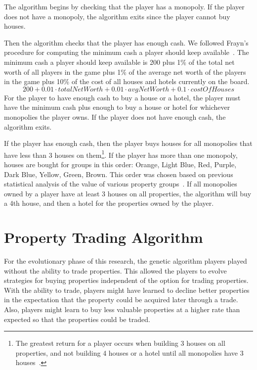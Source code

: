 The algorithm begins by checking that the player has a monopoly. If the player
does not have a monopoly, the algorithm exits since the player cannot buy
houses.

Then the algorithm checks that the player has enough cash. We followed Frayn's
procedure for computing the minimum cash a player should keep
available~\cite{DBLP:conf/cig/Frayn05}. The minimum cash a player should keep
available is 200 plus 1\% of the total net worth of all players in the game plus
1\% of the average net worth of the players in the game plus 10\% of the cost of
all houses and hotels currently on the board.
\begin{equation*}
200 + 0.01 \cdot totalNetWorth + 0.01 \cdot avgNetWorth + 0.1 \cdot costOfHouses
\end{equation*}
For the player to have enough cash to buy a house or a hotel, the player must
have the minimum cash plus enough to buy a house or hotel for whichever
monopolies the player owns. If the player does not have enough cash, the
algorithm exits.

If the player has enough cash, then the player buys houses for all monopolies
that have less than 3 houses on them\footnote{The greatest return for a player
occurs when building 3 houses on all properties, and not building 4 houses or a
hotel until all monopolies have 3 houses~\cite{orbanes2007monopoly}.}. If the
player has more than one monopoly, houses are bought for groups in this order:
Orange, Light Blue, Red, Purple, Dark Blue, Yellow, Green, Brown. This order was
chosen based on previous statistical analysis of the value of various property
groups~\cite{Ash1972,Abbott1997,DBLP:conf/cig/Frayn05}. If all monopolies owned
by a player have at least 3 houses on all properties, the algorithm will buy a
4th house, and then a hotel for the properties owned by the player.

\section{Property Trading Algorithm} \label{5_trade_property}

For the evolutionary phase of this research, the genetic algorithm players
played without the ability to trade properties. This allowed the players to
evolve strategies for buying properties independent of the option for trading
properties. With the ability to trade, players might have learned to decline
better properties in the expectation that the property could be acquired later
through a trade. Also, players might learn to buy less valuable properties at a
higher rate than expected so that the properties could be traded.

